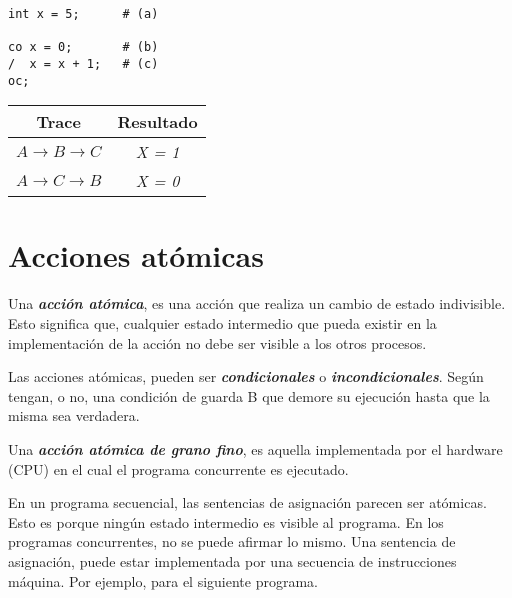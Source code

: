 \documentclass[a4paper, 10pt]{report}
\begin{document}
\begin{multicols}{2}

\begin{lstlisting}
int x = 5;      # (a)

co x = 0;       # (b)
/  x = x + 1;   # (c)
oc;
\end{lstlisting}
\columnbreak
    {\renewcommand{\arraystretch}{2}%
    \centering
    \begin{tabular}{cc}
        \textbf{Trace} & \textbf{Resultado}\\
        \hline 
        $A \rightarrow B \rightarrow C$ & \emph{X = 1}\\ 
        $A \rightarrow C \rightarrow B$ & \emph{X = 0}\\ 
    \end{tabular}}
\end{multicols}

\section{Acciones atómicas}

Una \textbf{\emph{acción atómica}}, es una acción que realiza un cambio de estado indivisible. Esto significa que, cualquier estado intermedio que pueda existir en la implementación de la acción no debe ser visible a los otros procesos.

Las acciones atómicas, pueden ser \textbf{\emph{condicionales}} o \textbf{\emph{incondicionales}}. Según tengan, o no, una condición de guarda B que demore su ejecución hasta que la misma sea verdadera.

Una \textbf{\emph{acción atómica de grano fino}}, es aquella implementada por el hardware (CPU) en el cual el programa concurrente es ejecutado.

En un programa secuencial, las sentencias de asignación parecen ser atómicas. Esto es porque ningún estado intermedio es visible al programa. En los programas concurrentes, no se puede afirmar lo mismo. Una sentencia de asignación, puede estar implementada por una secuencia de instrucciones máquina. Por ejemplo, para el siguiente programa.
\end{document}

